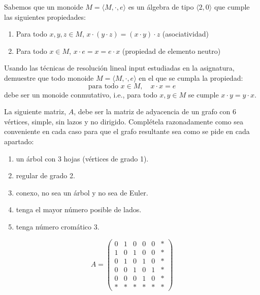 \documentclass[12pt]{article}
\begin{document}
    \begin{ejercicio} Sabemos que un monoide $M=\langle M, \cdot, e\rangle$ es un álgebra de tipo $\langle 2,0 \rangle$ que cumple las siguientes propiedades:
        \begin{enumerate}[label=\alph*)]
            \item Para todo $x, y, z \in M$, $x \cdot (y \cdot z) = (x \cdot y) \cdot z$ (asociatividad)
            \item Para todo $x \in M$, $x \cdot e = x = e \cdot x$ (propiedad de elemento neutro)
        \end{enumerate}
        Usando las técnicas de resolución lineal input estudiadas en la asignatura, demuestre que todo monoide $M=\langle M, \cdot, e\rangle$ en el que se cumpla la propiedad:
        $$\text{para todo } x \in M, \quad x \cdot x = e$$
        debe ser un monoide conmutativo, i.e., para todo $x, y \in M$ se cumple $x \cdot y = y \cdot x$.
    \end{ejercicio}

    
    \begin{ejercicio} La siguiente matriz, $A$, debe ser la matriz de adyacencia de un grafo con 6 vértices, simple, sin lazos y no dirigido. Complétela razonadamente como sea conveniente en cada caso para que el grafo resultante sea como se pide en cada apartado:
        \begin{enumerate}[label=\alph*)]
            \item un árbol con 3 hojas (vértices de grado 1).
            \item regular de grado 2.
            \item conexo, no sea un árbol y no sea de Euler.
            \item tenga el mayor número posible de lados.
            \item tenga número cromático 3.
        \end{enumerate}
        $$
        A = \begin{pmatrix}
        0 & 1 & 0 & 0 & 0 & * \\
        1 & 0 & 1 & 0 & 0 & * \\
        0 & 1 & 0 & 1 & 0 & * \\
        0 & 0 & 1 & 0 & 1 & * \\
        0 & 0 & 0 & 1 & 0 & * \\
        * & * & * & * & * & *
        \end{pmatrix}
        $$
    \end{ejercicio}
\end{document}
